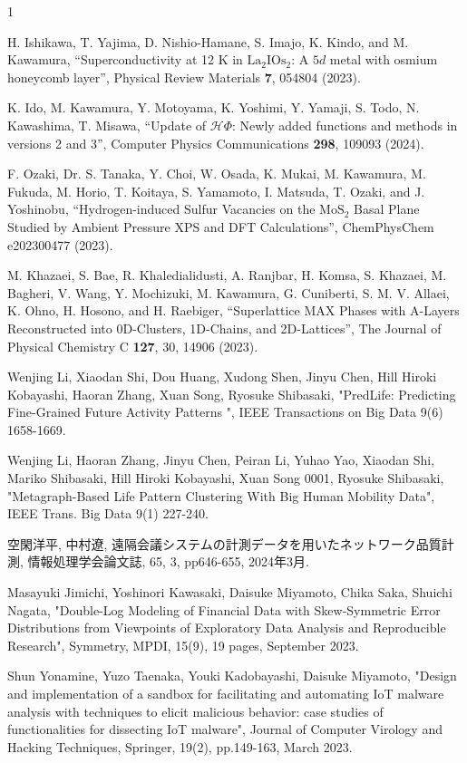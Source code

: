 \begin{雑誌論文}{1}

H. Ishikawa, T. Yajima, D. Nishio-Hamane, S. Imajo, K. Kindo, and M. Kawamura,
``Superconductivity at 12 K in ${\mathrm{La}}_{2}{\mathrm{IOs}}_{2}$: A $5d$ metal with osmium honeycomb layer'',
Physical Review Materials \textbf{7}, 054804 (2023).

K. Ido, M. Kawamura, Y. Motoyama, K. Yoshimi, Y. Yamaji, S. Todo, N. Kawashima, T. Misawa,
``Update of $\mathcal{H}\Phi$: Newly added functions and methods in versions 2 and 3'',
Computer Physics Communications \textbf{298}, 109093 (2024).

F. Ozaki, Dr. S. Tanaka, Y. Choi, W. Osada, K. Mukai, M. Kawamura, M. Fukuda, M. Horio, T. Koitaya, S. Yamamoto, I. Matsuda, T. Ozaki, and J. Yoshinobu,
``Hydrogen-induced Sulfur Vacancies on the $\mathrm{MoS}_2$ Basal Plane Studied by Ambient Pressure XPS and DFT Calculations'',
ChemPhysChem e202300477 (2023).

M. Khazaei, S. Bae, R. Khaledialidusti, A. Ranjbar, H. Komsa, S. Khazaei, M. Bagheri, V. Wang, Y. Mochizuki, M. Kawamura, G. Cuniberti, S. M. V. Allaei, K. Ohno, H. Hosono, and H. Raebiger, 
``Superlattice MAX Phases with A-Layers Reconstructed into 0D-Clusters, 1D-Chains, and 2D-Lattices'',
The Journal of Physical Chemistry C \textbf{127}, 30, 14906 (2023).

 Wenjing Li, Xiaodan Shi, Dou Huang, Xudong Shen, Jinyu Chen, Hill Hiroki Kobayashi, Haoran Zhang, Xuan Song, Ryosuke Shibasaki,  "PredLife: Predicting Fine-Grained Future Activity Patterns ", IEEE Transactions on Big Data 9(6) 1658-1669.

 Wenjing Li, Haoran Zhang, Jinyu Chen, Peiran Li, Yuhao Yao, Xiaodan Shi, Mariko Shibasaki, Hill Hiroki Kobayashi, Xuan Song 0001, Ryosuke Shibasaki,  "Metagraph-Based Life Pattern Clustering With Big Human Mobility Data", IEEE Trans. Big Data 9(1) 227-240.
 
空閑洋平, 中村遼, 遠隔会議システムの計測データを用いたネットワーク品質計測, 情報処理学会論文誌, 65, 3, pp646-655, 2024年3月.

Masayuki Jimichi, Yoshinori Kawasaki, Daisuke Miyamoto, Chika Saka, Shuichi Nagata,
"Double-Log Modeling of Financial Data with Skew-Symmetric Error Distributions from Viewpoints of Exploratory Data Analysis and Reproducible Research",
Symmetry, MPDI, 15(9), 19 pages, September 2023. 

Shun Yonamine, Yuzo Taenaka, Youki Kadobayashi, Daisuke Miyamoto,
"Design and implementation of a sandbox for facilitating and automating IoT malware analysis with techniques to elicit malicious behavior: case studies of functionalities for dissecting IoT malware",
Journal of Computer Virology and Hacking Techniques, Springer, 19(2), pp.149-163, March 2023.

\end{雑誌論文}

